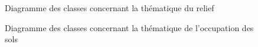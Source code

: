 \documentclass{themeensg}
\begin{document}
\begin{appendices}
\addtocounter{figure}{-1}
\begin{figure}
\addtocounter{figure}{1}
\centering
{}%
\caption{Diagramme des classes concernant la thématique du relief}%
\end{figure}

\addtocounter{figure}{-1}
\begin{figure}
\addtocounter{figure}{1}
\centering
{}%
\caption{Diagramme des classes concernant la thématique de l'occupation des sols}%
\end{figure}


\end{appendices}
\end{document}
